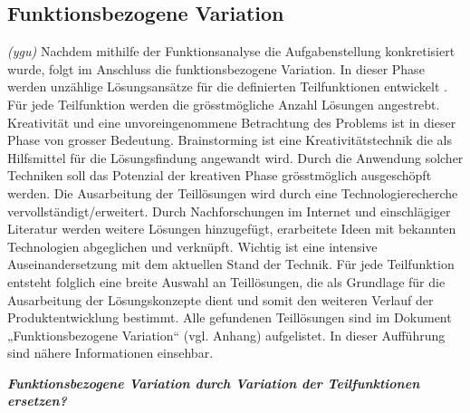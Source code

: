 \subsection{Funktionsbezogene Variation}
\label{funktionsbez_var}
\textit{(ygu)} Nachdem mithilfe der Funktionsanalyse die Aufgabenstellung konkretisiert wurde, folgt im Anschluss die funktionsbezogene Variation. In dieser Phase werden unzählige Lösungsansätze für die definierten Teilfunktionen entwickelt \cite{pahl}. Für jede Teilfunktion werden die grösstmögliche Anzahl Lösungen angestrebt.
\newline
Kreativität und eine unvoreingenommene Betrachtung des Problems ist in dieser Phase von grosser Bedeutung. Brainstorming ist eine Kreativitätstechnik die als Hilfsmittel für die Lösungsfindung angewandt wird. Durch die Anwendung solcher Techniken soll das Potenzial der kreativen Phase grösstmöglich ausgeschöpft werden.
\newline
Die Ausarbeitung der Teillösungen wird durch eine Technologierecherche vervollständigt/erweitert. Durch Nachforschungen im Internet und einschlägiger Literatur werden weitere Lösungen hinzugefügt, erarbeitete Ideen mit bekannten Technologien abgeglichen und verknüpft. Wichtig ist eine intensive Auseinandersetzung mit dem aktuellen Stand der Technik.
\newline
Für jede Teilfunktion entsteht folglich eine breite Auswahl an Teillösungen, die als Grundlage für die Ausarbeitung der Lösungskonzepte dient und somit den weiteren Verlauf der Produktentwicklung bestimmt. Alle gefundenen Teillösungen sind im Dokument „Funktionsbezogene Variation“ (vgl. Anhang) aufgelistet. In dieser Aufführung sind nähere Informationen einsehbar.

\textbf{\textit{Funktionsbezogene Variation durch Variation der Teilfunktionen ersetzen?}}
